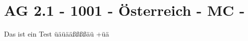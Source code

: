 \section{AG 2.1 - 1001 - Österreich - MC - }

\begin{beispiel}[AG 2.1]{1}
Das ist ein Test üäüääßßßßäü +üä
\end{beispiel}